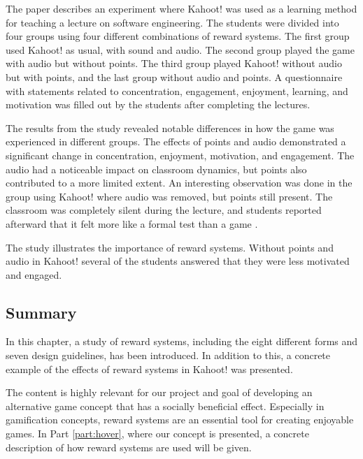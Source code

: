 The paper describes an experiment where Kahoot! was used as a learning method for teaching a lecture on software engineering. The students were divided into four groups using four different combinations of reward systems. The first group used Kahoot! as usual, with sound and audio. The second group played the game with audio but without points. The third group played Kahoot! without audio but with points, and the last group without audio and points. A questionnaire with statements related to concentration, engagement, enjoyment, learning, and motivation was filled out by the students after completing the lectures. 

The results from the study revealed notable differences in how the game was experienced in different groups. The effects of points and audio demonstrated a significant change in concentration, enjoyment, motivation, and engagement. The audio had a noticeable impact on classroom dynamics, but points also contributed to a more limited extent. An interesting observation was done in the group using Kahoot! where audio was removed, but points still present. The classroom was completely silent during the lecture, and students reported afterward that it felt more like a formal test than a game \citep{wang_effect_2016}.

The study illustrates the importance of reward systems. Without points and audio in Kahoot! several of the students answered that they were less motivated and engaged.

\subsection{Summary}
In this chapter, a study of reward systems, including the eight different forms and seven design guidelines, has been introduced. In addition to this, a concrete example of the effects of reward systems in Kahoot! was presented. 

The content is highly relevant for our project and goal of developing an alternative game concept that has a socially beneficial effect. Especially in gamification concepts, reward systems are an essential tool for creating enjoyable games. In Part \ref{part:hover}, where our concept is presented, a concrete description of how reward systems are used will be given.
